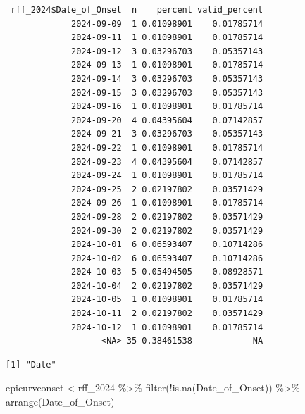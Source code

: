\documentclass[
  letterpaper,
  DIV=11,
  numbers=noendperiod]{scrartcl}
\newenvironment{Shaded}{\begin{snugshade}}{\end{snugshade}}
\newcommand{\AttributeTok}[1]{\textcolor[rgb]{0.40,0.45,0.13}{#1}}
\newcommand{\FunctionTok}[1]{\textcolor[rgb]{0.28,0.35,0.67}{#1}}
\newcommand{\NormalTok}[1]{\textcolor[rgb]{0.00,0.23,0.31}{#1}}
\newcommand{\OtherTok}[1]{\textcolor[rgb]{0.00,0.23,0.31}{#1}}
\newcommand{\SpecialCharTok}[1]{\textcolor[rgb]{0.37,0.37,0.37}{#1}}
\newcommand{\StringTok}[1]{\textcolor[rgb]{0.13,0.47,0.30}{#1}}
\begin{document}
\begin{Shaded}
\end{Shaded}

\begin{verbatim}
 rff_2024$Date_of_Onset  n    percent valid_percent
             2024-09-09  1 0.01098901    0.01785714
             2024-09-11  1 0.01098901    0.01785714
             2024-09-12  3 0.03296703    0.05357143
             2024-09-13  1 0.01098901    0.01785714
             2024-09-14  3 0.03296703    0.05357143
             2024-09-15  3 0.03296703    0.05357143
             2024-09-16  1 0.01098901    0.01785714
             2024-09-20  4 0.04395604    0.07142857
             2024-09-21  3 0.03296703    0.05357143
             2024-09-22  1 0.01098901    0.01785714
             2024-09-23  4 0.04395604    0.07142857
             2024-09-24  1 0.01098901    0.01785714
             2024-09-25  2 0.02197802    0.03571429
             2024-09-26  1 0.01098901    0.01785714
             2024-09-28  2 0.02197802    0.03571429
             2024-09-30  2 0.02197802    0.03571429
             2024-10-01  6 0.06593407    0.10714286
             2024-10-02  6 0.06593407    0.10714286
             2024-10-03  5 0.05494505    0.08928571
             2024-10-04  2 0.02197802    0.03571429
             2024-10-05  1 0.01098901    0.01785714
             2024-10-11  2 0.02197802    0.03571429
             2024-10-12  1 0.01098901    0.01785714
                   <NA> 35 0.38461538            NA
\end{verbatim}

\begin{Shaded}
\end{Shaded}

\begin{verbatim}
[1] "Date"
\end{verbatim}

\begin{Shaded}
\begin{Highlighting}[]
\NormalTok{epicurveonset }\OtherTok{\textless{}{-}}\NormalTok{rff\_2024 }\SpecialCharTok{\%\textgreater{}\%}
    \FunctionTok{filter}\NormalTok{(}\SpecialCharTok{!}\FunctionTok{is.na}\NormalTok{(}\StringTok{\textasciigrave{}}\AttributeTok{Date\_of\_Onset}\StringTok{\textasciigrave{}}\NormalTok{)) }\SpecialCharTok{\%\textgreater{}\%}  \FunctionTok{arrange}\NormalTok{(}\StringTok{\textasciigrave{}}\AttributeTok{Date\_of\_Onset}\StringTok{\textasciigrave{}}\NormalTok{)}
\end{Highlighting}
\end{Shaded}
\end{document}
